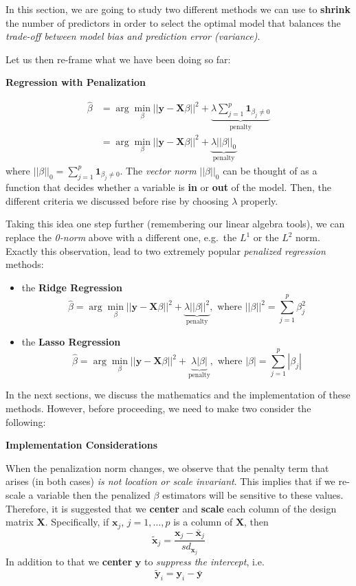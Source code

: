 \documentclass[
]{book}
\begin{document}
In this section, we are going to study two different methods we can use to \textbf{shrink} the number of predictors in order to select the optimal model that balances the \emph{trade-off between model bias and prediction error (variance)}.

Let us then re-frame what we have been doing so far:

\textbf{Regression with Penalization}

\begin{align*}
\hat{\beta} &= \arg\min_{\beta} ||\mathbf{y} - \mathbf{X}\beta||^2 + \underbrace{\lambda \sum_{j=1}^{p} \mathbf{1}_{\beta_j \neq 0}}_{\text{penalty}}\\
&=  \arg\min_{\beta} ||\mathbf{y} - \mathbf{X}\beta||^2 + \underbrace{\lambda ||\beta||_0}_{\text{penalty}}
\end{align*}
where \(||\beta||_0 = \sum_{j=1}^{p} \mathbf{1}_{\beta_j \neq 0}\). The \emph{vector norm} \(||\beta||_0\) can be thought of as a function that decides whether a variable is \textbf{in} or \textbf{out} of the model. Then, the different criteria we discussed before rise by choosing \(\lambda\) properly.

Taking this idea one step further (remembering our linear algebra tools), we can replace the \emph{0-norm} above with a different one, e.g.~the \(L^1\) or the \(L^2\) norm. Exactly this observation, lead to two extremely popular \emph{penalized regression} methods:

\begin{itemize}
\item
  the \textbf{Ridge Regression}
  \[\hat{\beta} =  \arg\min_{\beta} ||\mathbf{y} - \mathbf{X}\beta||^2 + \underbrace{\lambda ||\beta||^2}_{\text{penalty}}, \text{ where } ||\beta||^2 = \sum_{j=1}^{p} \beta_j^2\]
\item
  the \textbf{Lasso Regression}
  \[\hat{\beta} =  \arg\min_{\beta} ||\mathbf{y} - \mathbf{X}\beta||^2 + \underbrace{\lambda |\beta|}_{\text{penalty}}, \text{ where }  |\beta| = \sum_{j=1}^{p} |\beta_j|\]
\end{itemize}

In the next sections, we discuss the mathematics and the implementation of these methods. However, before proceeding, we need to make two consider the following:

\textbf{Implementation Considerations}

When the penalization norm changes, we observe that the penalty term that arises (in both cases) \emph{is not location or scale invariant}. This implies that if we re-scale a variable then the penalized \(\beta\) estimators will be sensitive to these values. Therefore, it is suggested that we \textbf{center} and \textbf{scale} each column of the design matrix \(\mathbf{X}\). Specifically, if \(\mathbf{x}_{j}\), \(j=1, \ldots, p\) is a column of \(\mathbf{X}\), then
\[\tilde{\mathbf{x}}_{j} = \frac{ \mathbf{x}_{j} - \bar{\mathbf{x}}_{j} } { sd_{\mathbf{x}_{j}}} \]
In addition to that we \textbf{center} \(\mathbf{y}\) to \emph{suppress the intercept}, i.e.~\[\mathbf{\tilde{y}}_i = \mathbf{y}_{i} - \bar{\mathbf{y}}\]
\end{document}
